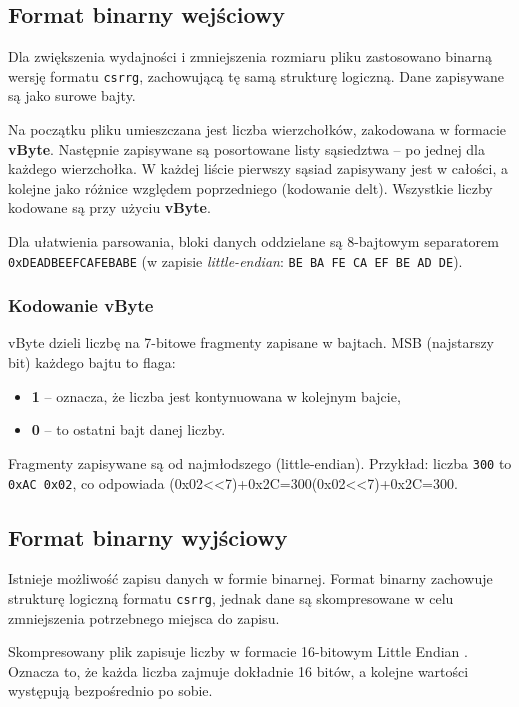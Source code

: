 \documentclass[a4paper,12pt]{article}
\begin{document}
\subsection*{Format binarny wejściowy}

Dla zwiększenia wydajności i zmniejszenia rozmiaru pliku zastosowano binarną wersję formatu \texttt{csrrg}, zachowującą tę samą strukturę logiczną. Dane zapisywane są jako surowe bajty.

Na początku pliku umieszczana jest liczba wierzchołków, zakodowana w formacie \textbf{vByte}. Następnie zapisywane są posortowane listy sąsiedztwa – po jednej dla każdego wierzchołka. W każdej liście pierwszy sąsiad zapisywany jest w całości, a kolejne jako różnice względem poprzedniego (kodowanie delt). Wszystkie liczby kodowane są przy użyciu \textbf{vByte}.

Dla ułatwienia parsowania, bloki danych oddzielane są 8-bajtowym separatorem \\ 
\texttt{0xDEADBEEFCAFEBABE} (w zapisie \textit{little-endian}: \texttt{BE BA FE CA EF BE AD DE}).

\subsubsection*{Kodowanie vByte}

vByte dzieli liczbę na 7-bitowe fragmenty zapisane w bajtach. MSB (najstarszy bit) każdego bajtu to flaga:
\begin{itemize}
\item \textbf{1} – oznacza, że liczba jest kontynuowana w kolejnym bajcie,
\item \textbf{0} – to ostatni bajt danej liczby.
\end{itemize}

Fragmenty zapisywane są od najmłodszego (little-endian). Przykład: liczba \texttt{300} to \texttt{0xAC 0x02}, co odpowiada (0x02<<7)+0x2C=300(0x02<<7)+0x2C=300.

\subsection*{Format binarny wyjściowy}
Istnieje możliwość zapisu danych w formie binarnej. Format binarny zachowuje strukturę logiczną formatu \texttt{csrrg}, jednak dane są skompresowane w celu zmniejszenia potrzebnego miejsca do zapisu.

Skompresowany plik zapisuje liczby w formacie 16-bitowym Little Endian . Oznacza to, że każda liczba zajmuje dokładnie 16 bitów, a kolejne wartości występują bezpośrednio po sobie.
\end{document}
